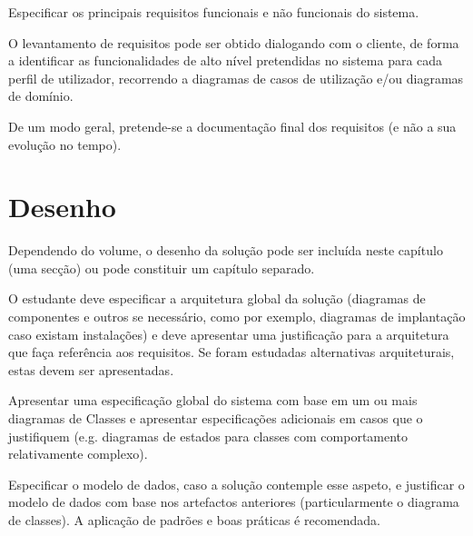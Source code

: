 Especificar os principais requisitos funcionais e não funcionais do sistema. 

O levantamento de requisitos pode ser obtido dialogando com o cliente, de forma a identificar as funcionalidades de alto nível pretendidas no sistema para cada perfil de utilizador, recorrendo a diagramas de casos de utilização e/ou diagramas de domínio. 

De um modo geral, pretende-se a documentação final dos requisitos (e não a sua evolução no tempo).



\section{Desenho} 
\label{sec:desenho}

Dependendo do volume, o desenho da solução pode ser incluída neste capítulo (uma secção) ou pode constituir um capítulo separado.

O estudante deve especificar a arquitetura global da solução (diagramas de componentes e outros se necessário, como por exemplo, diagramas de implantação caso existam instalações) e deve apresentar uma justificação para a arquitetura que faça referência aos requisitos. 
Se foram estudadas alternativas arquiteturais, estas devem ser apresentadas.

Apresentar uma especificação global do sistema com base em um ou mais diagramas de Classes e apresentar especificações adicionais em casos que o justifiquem (e.g. diagramas de estados para classes com comportamento relativamente complexo).

Especificar o modelo de dados, caso a solução contemple esse aspeto, e justificar o modelo de dados com base nos artefactos anteriores (particularmente o diagrama de classes).
A aplicação de padrões e boas práticas é recomendada.
